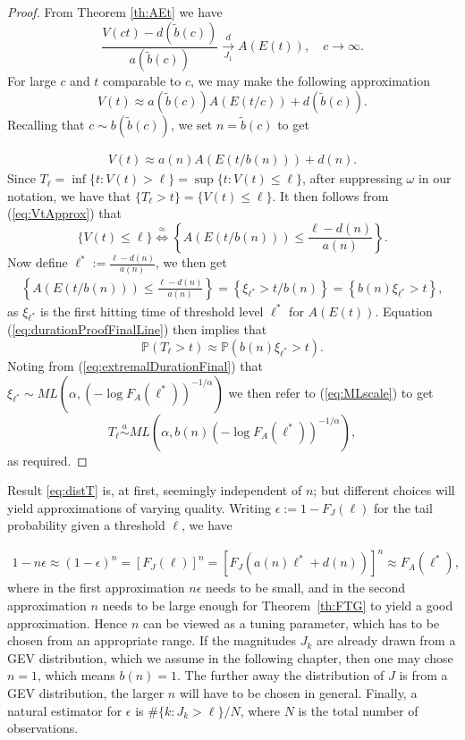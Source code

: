 \documentclass[honours,12pt,twoside, openright]{unswthesis}
\newcommand{\PP}{\mathbb{P}}
\newcommand{\1}{\mathbf 1}
\newcommand{\cdj}{\overset{d}{\underset{J_1}{\longrightarrow}}}
\numberwithin{equation}{section}
\theoremstyle{definition}
\theoremstyle{remark}
\begin{document}
\begin{proof}
From Theorem \ref{th:AEt} we have
\[
	\frac{V(ct)-d(\tilde{b}(c))}{a(\tilde{b}(c))} \cdj A(E(t)), \quad c\to\infty.
\]
For large $c$ and $t$ comparable to $c$, we may make the following approximation
\[
	V(t) \approx a(\tilde b(c)) A(E(t/c)) + d(\tilde b(c)). 
\]
Recalling that $c \sim b(\tilde b(c))$, we set $n = \tilde b(c)$
to get

\begin{align}\label{eq:VtApprox}
	V(t) \approx a(n) A(E(t/b(n))) + d(n). 
\end{align}
Since $T_\ell=\inf\{t: V(t) > \ell\}=\sup\{t: V(t) \leq \ell\}$, after suppressing $\omega$ in our notation, we have that $\{T_\ell>t\}=\{V(t) \leq \ell\}$. It then follows from (\ref{eq:VtApprox}) that 
\[
	\{V(t) \leq \ell\} \stackrel{\approx}{\Longleftrightarrow} \left\{A(E(t/b(n))) \leq \frac{\ell - d(n)}{a(n)}\right\}.
\]
Now define  $\ell^* := \frac{\ell - d(n)}{a(n)}$, we then get
\begin{align}\label{eq:durationProofFinalLine}
\left\{A(E(t/b(n))) \leq \frac{\ell - d(n)}{a(n)}\right\}=\left\{\xi_{\ell^*} > t/b(n)\right\}=\left\{b(n)\xi_{\ell^*} > t\right\},
\end{align}
as $\xi_{\ell^*}$ is the first hitting time of threshold level $\ell^*$ for $A(E(t))$. Equation (\ref{eq:durationProofFinalLine}) then implies that
\[
	\PP(T_\ell>t)\approx\PP(b(n)\xi_{\ell^*} > t).
\]
Noting from (\ref{eq:extremalDurationFinal}) that $\xi_{\ell^*} \sim ML\left(\alpha,(-\log F_A({\ell^*}))^{-1/\alpha}\right)$ we then refer to (\ref{eq:MLscale}) to get
\[
	T_\ell\overset{a}{\sim}ML\left(\alpha, b(n)(-\log F_A(\ell^*))^{-1/\alpha}\right),
\]
as required.
\end{proof}

Result \eqref{eq:distT} is, at first, seemingly independent of $n$; but
different choices will yield approximations of varying quality. Writing
$\epsilon := 1 - F_J(\ell)$ for the tail probability given a threshold
$\ell$, we have

\begin{align*}
1 - n \epsilon \approx (1 - \epsilon)^n
= [F_J(\ell)]^n
= \left[F_J(a(n) \ell^* + d(n))\right]^n
\approx F_A(\ell^*),
\end{align*}
where in the first approximation $n \epsilon$ needs to be small, 
and in the second approximation $n$ needs to be large enough for
Theorem~\ref{th:FTG} to yield a good approximation.
Hence $n$ can be viewed as a tuning parameter, which has to be chosen
from an appropriate range. 
If the magnitudes $J_k$ are already drawn from a GEV distribution,
which we assume in the following chapter,
then one may chose $n = 1$, which means $b(n) = 1$.
The further away the distribution of $J$ is from a GEV distribution, 
the larger $n$ will have to be chosen in general.
Finally, a natural estimator for $\epsilon$ is $\#\{k: J_k > \ell\}/N$,
where $N$ is the total number of observations. 
\end{document}
